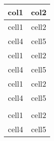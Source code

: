 \centering
\begin{tabular}[width = linewidth]{||c|c||}
 
 \hline
 col1 & col2 \\ [0.5ex]
 \hline\hline
 cell1 & cell2 \\
 \hline
 cell4 & cell5 \\
 \hline
 cell1 & cell2 \\
 \hline
 cell4 & cell5 \\
 \hline
 cell1 & cell2 \\
 \hline
 cell4 & cell5 \\
 \hline\\
 cell1 & cell2 \\
 \hline
 cell4 & cell5 \\
 \hline
\end{tabular}
